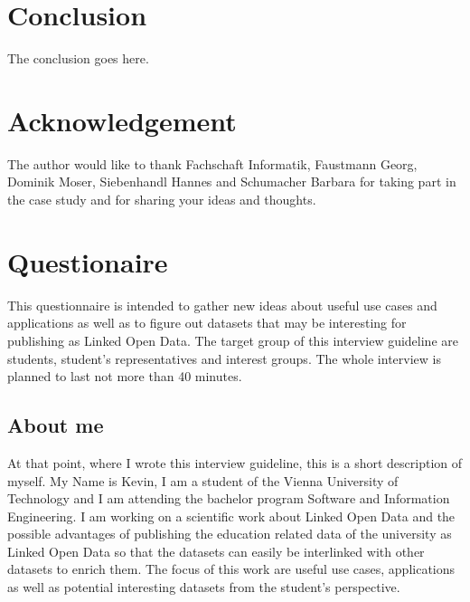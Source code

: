\documentclass{article}
\begin{document}
\section{Conclusion}
\label{conclusion}
The conclusion goes here.

 
\section{Acknowledgement}
\label{acknowledgement}
The author would like to thank Fachschaft Informatik, Faustmann Georg, Dominik Moser, Siebenhandl Hannes and Schumacher Barbara for taking part in the case study and for sharing your ideas and thoughts.

\newpage
\appendix


\section{Questionaire}
\label{questionaire}
This questionnaire is intended to gather new ideas about useful use cases and applications as well as to figure out datasets that may be interesting for publishing as Linked Open Data. The target group of this interview guideline are students, student’s representatives and interest groups. The whole interview is planned to last not more than 40 minutes.

\subsection{About me}
\label{questionaire:about-me}
At that point, where I wrote this interview guideline, this is a short description of myself. My Name is Kevin, I am a student of the Vienna University of Technology and I am attending the bachelor program Software and Information Engineering. I am working on a scientific work about Linked Open Data and the possible advantages of publishing the education related data of the university as Linked Open Data so that the datasets can easily be interlinked with other datasets to enrich them. The focus of this work are useful use cases, applications as well as potential interesting datasets from the student’s perspective.
\end{document}
